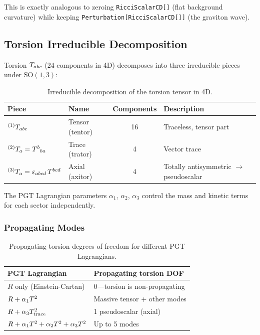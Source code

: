 This is exactly analogous to zeroing \texttt{RicciScalarCD[]} (flat background curvature) while keeping \texttt{Perturbation[RicciScalarCD[]]} (the graviton wave).

\subsection{Torsion Irreducible Decomposition}
\label{sec:torsion-irreducible}

Torsion $T_{abc}$ (24 components in 4D) decomposes into three irreducible pieces under $\mathrm{SO}(1,3)$:

\begin{table}[htbp]
\centering
\caption{Irreducible decomposition of the torsion tensor in 4D.}
\label{tab:torsion-irreducible}
\begin{tabular}{@{}llcl@{}}
\toprule
Piece & Name & Components & Description \\
\midrule
${}^{(1)}T_{abc}$ & Tensor (tentor) & 16 & Traceless, tensor part \\
${}^{(2)}T_a = T^b{}_{ba}$ & Trace (trator) & 4 & Vector trace \\
${}^{(3)}T_a = \varepsilon_{abcd}\,T^{bcd}$ & Axial (axitor) & 4 & Totally antisymmetric $\to$ pseudoscalar \\
\bottomrule
\end{tabular}
\end{table}

The PGT Lagrangian parameters $\alpha_1$, $\alpha_2$, $\alpha_3$ control the mass and kinetic terms for each sector independently.

\subsubsection{Propagating Modes}
\label{sec:propagating-modes}

\begin{table}[htbp]
\centering
\caption{Propagating torsion degrees of freedom for different PGT Lagrangians.}
\label{tab:propagating-modes}
\begin{tabular}{@{}ll@{}}
\toprule
PGT Lagrangian & Propagating torsion DOF \\
\midrule
$R$ only (Einstein-Cartan) & 0---torsion is non-propagating \\
$R + \alpha_1 T^2$ & Massive tensor + other modes \\
$R + \alpha_3 T^2_\text{trace}$ & 1 pseudoscalar (axial) \\
$R + \alpha_1 T^2 + \alpha_2 T^2 + \alpha_3 T^2$ & Up to 5 modes \\
\bottomrule
\end{tabular}
\end{table}

